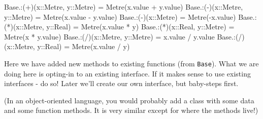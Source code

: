 \documentclass[
]{article}
\newenvironment{Shaded}{\begin{snugshade}}{\end{snugshade}}
\newcommand{\BuiltInTok}[1]{\textcolor[rgb]{0.00,0.23,0.31}{#1}}
\newcommand{\DataTypeTok}[1]{\textcolor[rgb]{0.68,0.00,0.00}{#1}}
\newcommand{\FunctionTok}[1]{\textcolor[rgb]{0.28,0.35,0.67}{#1}}
\newcommand{\NormalTok}[1]{\textcolor[rgb]{0.00,0.23,0.31}{#1}}
\newcommand{\OperatorTok}[1]{\textcolor[rgb]{0.37,0.37,0.37}{#1}}
\begin{document}
\begin{Shaded}
\begin{Highlighting}[]
\BuiltInTok{Base}\NormalTok{.}\OperatorTok{:}\NormalTok{(}\OperatorTok{+}\NormalTok{)(x}\OperatorTok{::}\DataTypeTok{Metre}\NormalTok{, y}\OperatorTok{::}\DataTypeTok{Metre}\NormalTok{) }\OperatorTok{=} \FunctionTok{Metre}\NormalTok{(x.value }\OperatorTok{+}\NormalTok{ y.value)}
\BuiltInTok{Base}\NormalTok{.}\OperatorTok{:}\NormalTok{(}\OperatorTok{{-}}\NormalTok{)(x}\OperatorTok{::}\DataTypeTok{Metre}\NormalTok{, y}\OperatorTok{::}\DataTypeTok{Metre}\NormalTok{) }\OperatorTok{=} \FunctionTok{Metre}\NormalTok{(x.value }\OperatorTok{{-}}\NormalTok{ y.value)}
\BuiltInTok{Base}\NormalTok{.}\OperatorTok{:}\NormalTok{(}\OperatorTok{{-}}\NormalTok{)(x}\OperatorTok{::}\DataTypeTok{Metre}\NormalTok{) }\OperatorTok{=} \FunctionTok{Metre}\NormalTok{(}\OperatorTok{{-}}\NormalTok{x.value)}
\BuiltInTok{Base}\NormalTok{.}\OperatorTok{:}\NormalTok{(}\OperatorTok{*}\NormalTok{)(x}\OperatorTok{::}\DataTypeTok{Metre}\NormalTok{, y}\OperatorTok{::}\DataTypeTok{Real}\NormalTok{) }\OperatorTok{=} \FunctionTok{Metre}\NormalTok{(x.value }\OperatorTok{*}\NormalTok{ y)}
\BuiltInTok{Base}\NormalTok{.}\OperatorTok{:}\NormalTok{(}\OperatorTok{*}\NormalTok{)(x}\OperatorTok{::}\DataTypeTok{Real}\NormalTok{, y}\OperatorTok{::}\DataTypeTok{Metre}\NormalTok{) }\OperatorTok{=} \FunctionTok{Metre}\NormalTok{(x }\OperatorTok{*}\NormalTok{ y.value)}
\BuiltInTok{Base}\NormalTok{.}\OperatorTok{:}\NormalTok{(}\OperatorTok{/}\NormalTok{)(x}\OperatorTok{::}\DataTypeTok{Metre}\NormalTok{, y}\OperatorTok{::}\DataTypeTok{Metre}\NormalTok{) }\OperatorTok{=}\NormalTok{ x.value }\OperatorTok{/}\NormalTok{ y.value}
\BuiltInTok{Base}\NormalTok{.}\OperatorTok{:}\NormalTok{(}\OperatorTok{/}\NormalTok{)(x}\OperatorTok{::}\DataTypeTok{Metre}\NormalTok{, y}\OperatorTok{::}\DataTypeTok{Real}\NormalTok{) }\OperatorTok{=} \FunctionTok{Metre}\NormalTok{(x.value }\OperatorTok{/}\NormalTok{ y)}
\end{Highlighting}
\end{Shaded}

Here we have added new methods to existing functions (from
\texttt{Base}). What we are doing here is opting-in to an existing
interface. If it makes sense to use existing interfaces - do so! Later
we'll create our own interface, but baby-steps first.

(In an object-oriented language, you would probably add a class with
some data and some function methods. It is very similar except for where
the methods live!)
\end{document}
